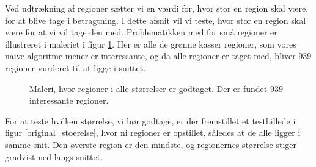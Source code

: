 {
Ved udtrækning af regioner sætter vi en værdi for, hvor stor en region skal
være, for at blive tage i betragtning. I dette afsnit vil vi teste, hvor stor
en region skal være for at vi vil tage den med. Problematikken med for små
regioner er illustreret i maleriet i figur \ref{alt_med}. Her er alle de grønne
kasser regioner, som vores naive algoritme mener er interessante, og da
alle regioner er taget med, bliver 939 regioner vurderet til at ligge i
snittet.

\begin{figure}[¡h]
    \setlength\fboxsep{0pt}
    \setlength\fboxrule{0.5pt}
    \begin{center}
    \end{center}
    \caption{Maleri, hvor regioner i alle størrelser er godtaget. Der er
	fundet $939$ interessante regioner.}
	\label{alt_med}
\end{figure}

For at teste hvilken størrelse, vi bør godtage, er der fremstillet et
testbillede i figur \ref{original_stoerelse}, hvor ni regioner er opstillet,
således at de alle ligger i samme snit. Den øverste region er den mindste, og
regionernes størrelse stiger gradvist ned langs snittet.

}
